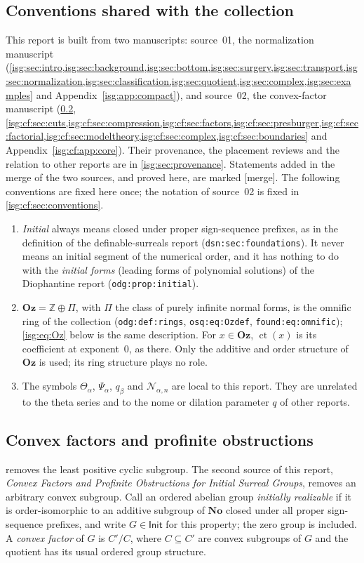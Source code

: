 \documentclass[11pt]{article}
\theoremstyle{definition}
\theoremstyle{remark}
\newcommand{\No}{\ensuremath{\mathbf{No}}}
\newcommand{\Oz}{\ensuremath{\mathbf{Oz}}}
\newcommand{\Z}{\mathbb{Z}}
\newcommand{\ct}{\operatorname{ct}}
\newcommand{\IR}{\mathsf{Init}}
\newcommand{\replabel}[1]{\nolinkurl{#1}}
\begin{document}
\subsection{Conventions shared with the collection}\label{isg:sec:conventions}
This report is built from two manuscripts: source~01, the normalization
manuscript (\cref{isg:sec:intro,isg:sec:background,isg:sec:bottom,isg:sec:surgery,isg:sec:transport,isg:sec:normalization,isg:sec:classification,isg:sec:quotient,isg:sec:complex,isg:sec:examples}
and Appendix~\ref{isg:app:compact}), and source~02, the convex-factor manuscript
(\cref{isg:cf:sec:intro}, \cref{isg:cf:sec:cuts,isg:cf:sec:compression,isg:cf:sec:factors,isg:cf:sec:presburger,isg:cf:sec:factorial,isg:cf:sec:modeltheory,isg:cf:sec:complex,isg:cf:sec:boundaries}
and Appendix~\ref{isg:cf:app:core}). Their provenance, the placement reviews and
the relation to other reports are in \cref{isg:sec:provenance}. Statements
added in the merge of the two sources, and proved here, are marked
\textup{[merge]}. The following conventions are fixed here once; the
notation of source~02 is fixed in \cref{isg:cf:sec:conventions}.
\begin{enumerate}
\item \emph{Initial} always means closed under proper sign-sequence
      prefixes, as in the definition of the definable-surreals report
      (\replabel{dsn:sec:foundations}). It never means an initial segment
      of the numerical order, and it has nothing to do with the
      \emph{initial forms} (leading forms of polynomial solutions) of the
      Diophantine report (\replabel{odg:prop:initial}).
\item $\Oz=\Z\oplus\Pi$, with $\Pi$ the class of purely infinite normal
      forms, is the omnific ring of the collection
      (\replabel{odg:def:rings}, \replabel{osq:eq:Ozdef},
      \replabel{found:eq:omnific}); \eqref{isg:eq:Oz} below is the same
      description. For $x\in\Oz$, $\ct(x)$ is its coefficient at
      exponent~$0$, as there. Only the additive and order structure of
      $\Oz$ is used; its ring structure plays no role.
\item The symbols $\Theta_\alpha$, $\Psi_\alpha$, $q_\beta$ and
      $\mathcal N_{\alpha,n}$ are local to this report. They are unrelated
      to the theta series and to the nome or dilation parameter $q$ of
      other reports.
\end{enumerate}

\subsection{Convex factors and profinite obstructions}\label{isg:cf:sec:intro}
 removes the least positive cyclic subgroup. The second
source of this report, \emph{Convex Factors and Profinite Obstructions for
Initial Surreal Groups}, removes an arbitrary convex subgroup. Call an
ordered abelian group \emph{initially realizable} if it is order-isomorphic
to an additive subgroup of $\No$ closed under all proper sign-sequence
prefixes, and write $G\in\IR$ for this property; the zero group is
included. A \emph{convex factor} of $G$ is $C'/C$, where $C\subseteq C'$
are convex subgroups of $G$ and the quotient has its usual ordered group
structure.
\end{document}
